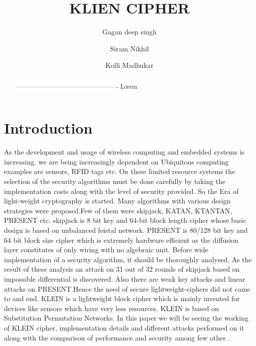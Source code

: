 \documentclass[preprint]{transcrypto}
\author{Gagan deep singh\inst{1} \and Siram Nikhil\inst{1} \and Kolli Madhukar\inst{1}}
\institute{
 Indian Institute of Technology, Bhilai, India 
}
\title{KLIEN CIPHER}
\begin{document}
\maketitle


\begin{abstract}
  ---------------------------------------------------- Lorem
\end{abstract}


\section{Introduction}
As the development and usage of wireless computing and embedded systems is increasing. we are being increasingly dependent on Ubiquitous computing examples are sensors, RFID tags etc. On these limited resource systems the selection of the security algorithms must be done carefully by taking the implementation costs along with the level of security provided. So the Era of light-weight cryptography is started. Many algorithms with various design strategies were proposed.Few of them were skipjack, KATAN\cite{KATAN}, KTANTAN\cite{KATAN}, PRESENT\cite{PRESENT} etc. skipjack is 8 bit key and 64-bit block length cipher whose basic design is based on unbalanced feistal network. PRESENT is 80/128 bit key and 64 bit block size cipher  which is extremely hardware efficient as the diffusion layer constitutes of only wiring with no algebraic unit.
Before wide implementation of a security algorithm, it should be thoroughly analysed. As the result of these analysis an attack on 31 out of 32 rounds of skipjack based on impossible differential is discovered. Also there are weak key attacks and linear attacks on PRESENT.Hence the need of secure lightweight-ciphers did not came to and end. KLEIN is a lightweight block cipher which is mainly invented for devices like sensors which have very less resources. KLEIN \cite{KLEIN} is based on Substitution Permutation Networks. In this paper we will be seeing the working of KLEIN cipher, implementation details and different attacks performed on it along with the comparison of performance and security among few other .
\end{document}

